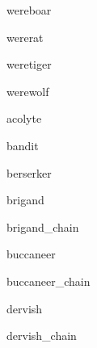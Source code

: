 \documentclass[letterpaper,serif]{module}
\begin{document}
\begin{newmonster}{wereboar}\end{newmonster}

\begin{newmonster}{wererat}\end{newmonster}

\begin{newmonster}{weretiger}\end{newmonster}

\begin{newmonster}{werewolf}\end{newmonster}

\begin{newmonster}{acolyte}\end{newmonster}

\begin{newmonster}{bandit}\end{newmonster}

\begin{newmonster}{berserker}\end{newmonster}

\begin{newmonster}{brigand}\end{newmonster}

\begin{newmonster}{brigand_chain}\end{newmonster}

\begin{newmonster}{buccaneer}\end{newmonster}

\begin{newmonster}{buccaneer_chain}\end{newmonster}

\begin{newmonster}{dervish}\end{newmonster}

\begin{newmonster}{dervish_chain}\end{newmonster}
\end{document}
